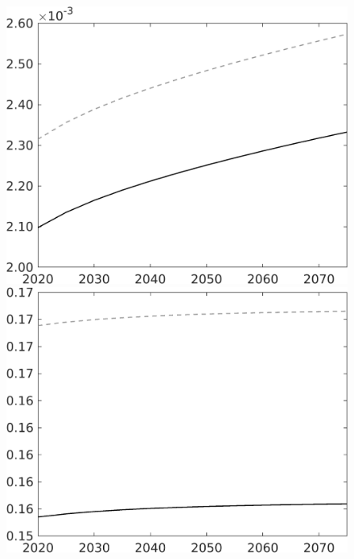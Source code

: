\documentclass[12pt]{article}
\begin{document}
\begin{figure}[h!!]
\begin{minipage}[]{0.32\textwidth}
	\end{minipage}	
	\begin{minipage}[]{0.32\textwidth}
		\includegraphics[width=1\textwidth]{../../codding_model/own_basedOnFried/optimalPol_010922_revision/figures/all_13Sept22/CompTaul_Equlab_LFBAU_Reg0_Lg_spillover0_nsk0_xgr0_knspil0_sep1_countec0_GovRev0_etaa0.79_lgd0.png}
	\end{minipage}	
	\begin{minipage}[]{0.32\textwidth}
		\includegraphics[width=1\textwidth]{../../codding_model/own_basedOnFried/optimalPol_010922_revision/figures/all_13Sept22/CompTaul_Equlab_LFBAU_Reg0_Ln_spillover0_nsk0_xgr0_knspil0_sep1_countec0_GovRev0_etaa0.79_lgd0.png}
	\end{minipage}	
\end{figure}
\end{document}
